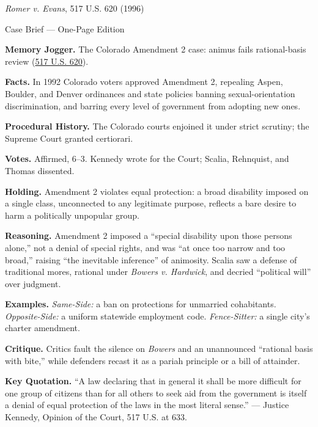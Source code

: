 \documentclass[12pt]{article}
\begin{document}
\begin{center}
{\Large \textit{Romer v. Evans}, 517 U.S. 620 (1996)\par}
\vspace{0.3em}
{\normalsize Case Brief --- One-Page Edition\par}
\end{center}

\textbf{Memory Jogger.} The Colorado Amendment 2 case: animus fails rational-basis review (\href{https://www.courtlistener.com/opinion/118027/romer-v-evans/}{517 U.S. 620}).

\textbf{Facts.} In 1992 Colorado voters approved Amendment 2, repealing Aspen, Boulder, and Denver ordinances and state policies banning sexual-orientation discrimination, and barring every level of government from adopting new ones.

\textbf{Procedural History.} The Colorado courts enjoined it under strict scrutiny; the Supreme Court granted certiorari.

\textbf{Votes.} Affirmed, 6--3. Kennedy wrote for the Court; Scalia, Rehnquist, and Thomas dissented.

\textbf{Holding.} Amendment 2 violates equal protection: a broad disability imposed on a single class, unconnected to any legitimate purpose, reflects a bare desire to harm a politically unpopular group.

\textbf{Reasoning.} Amendment 2 imposed a ``special disability upon those persons alone,'' not a denial of special rights, and was ``at once too narrow and too broad,'' raising ``the inevitable inference'' of animosity. Scalia saw a defense of traditional mores, rational under \textit{Bowers v. Hardwick}, and decried ``political will'' over judgment.

\textbf{Examples.} \emph{Same-Side:} a ban on protections for unmarried cohabitants. \emph{Opposite-Side:} a uniform statewide employment code. \emph{Fence-Sitter:} a single city's charter amendment.

\textbf{Critique.} Critics fault the silence on \textit{Bowers} and an unannounced ``rational basis with bite,'' while defenders recast it as a pariah principle or a bill of attainder.

\textbf{Key Quotation.} ``A law declaring that in general it shall be more difficult for one group of citizens than for all others to seek aid from the government is itself a denial of equal protection of the laws in the most literal sense.'' --- Justice Kennedy, Opinion of the Court, 517 U.S. at 633.
\end{document}
